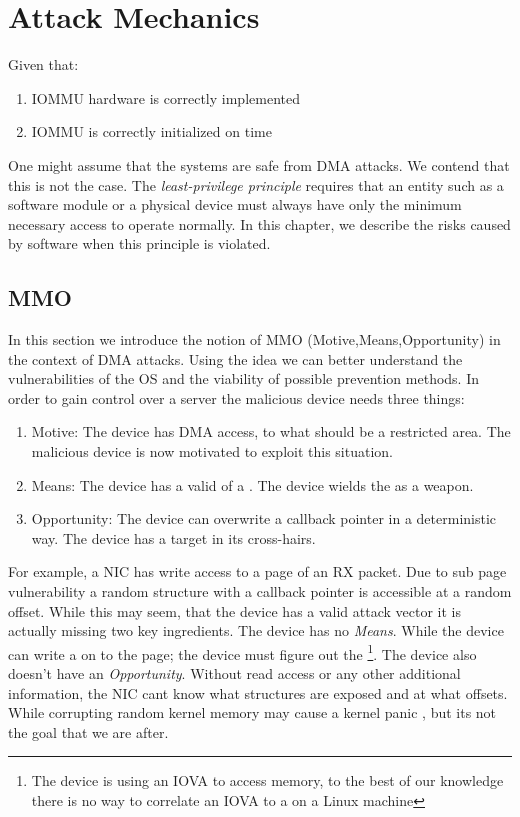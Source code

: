 \section{Attack Mechanics}
Given that:
\begin{enumerate}
    \item IOMMU hardware is correctly implemented 
    \item IOMMU is correctly initialized on time
\end{enumerate}
One might assume that the systems are safe from DMA attacks. We contend that this is not the case. The \textit{least-privilege principle} requires that an entity such as a software module or a physical device must always have only the minimum necessary access to operate normally. In this chapter, we describe the risks caused by software when this principle is violated.
\subsection{MMO}\label{sec:mmo}
In this section we introduce the notion of MMO (Motive,Means,Opportunity) in the context of DMA attacks. Using the idea we can better understand the vulnerabilities of the OS and the viability of possible prevention methods. In order to gain control over a server the malicious device needs three things:
\begin{enumerate}
    \item Motive: The device has DMA access, to what should be a restricted area. The malicious device is now motivated to exploit this situation. 
    \item Means: The device has a valid \kva of a \mabaf. The device wields the \kva as a weapon.
    \item Opportunity: The device can overwrite a callback pointer in a deterministic way. The device has a target in its cross-hairs.
\end{enumerate}
For example, a NIC has write access to a page of an RX packet. Due to sub page vulnerability a random structure with a callback pointer is accessible at a random offset. While this may seem, that the device has a valid attack vector it is actually missing two key ingredients. The device has no \textit{Means}. While the device can write a \mabaf on to the page; the device must figure out the \kva\footnote{The device is using an IOVA to access memory, to the best of our knowledge there is no way to correlate an IOVA to a \kva on a Linux machine}. The device also doesn't have an \textit{Opportunity}. Without  read access or any other additional information, the NIC cant know what structures are exposed and at what offsets. While corrupting random kernel memory may cause a kernel panic \cite{MMT16}, but its not the goal that we are after.


